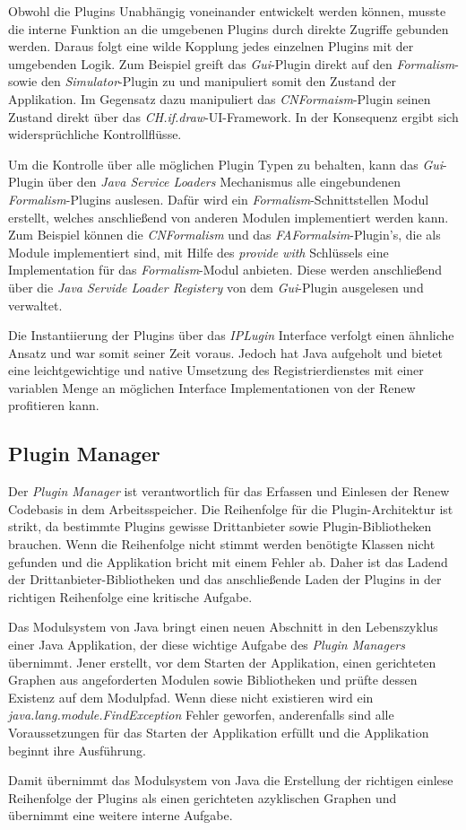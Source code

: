 Obwohl die Plugins Unabhängig voneinander entwickelt werden können, musste die interne Funktion an die umgebenen Plugins durch direkte Zugriffe gebunden werden. Daraus folgt eine wilde Kopplung jedes einzelnen Plugins mit der umgebenden Logik. Zum Beispiel greift das \textit{Gui}-Plugin direkt auf den \textit{Formalism}- sowie den \textit{Simulator}-Plugin zu und manipuliert somit den Zustand der Applikation. Im Gegensatz dazu manipuliert das \textit{CNFormaism}-Plugin seinen Zustand direkt über das \textit{CH.if.draw}-UI-Framework. In der Konsequenz ergibt sich widersprüchliche Kontrollflüsse.  


Um die Kontrolle über alle möglichen Plugin Typen zu behalten, kann das \textit{Gui}-Plugin über den \textit{Java Service Loaders} Mechanismus alle eingebundenen \textit{Formalism}-Plugins auslesen. Dafür wird ein \textit{Formalism}-Schnittstellen Modul erstellt, welches anschließend von anderen Modulen implementiert werden kann. Zum Beispiel können die \textit{CNFormalism} und das \textit{FAFormalsim}-Plugin's, die als Module implementiert sind, mit Hilfe des \textit{provide with} Schlüssels eine Implementation für das \textit{Formalism}-Modul anbieten. Diese werden anschließend über die \textit{Java Servide Loader Registery} von dem \textit{Gui}-Plugin ausgelesen und verwaltet. 

\bigbreak

Die Instantiierung der Plugins über das \textit{IPLugin} Interface verfolgt einen ähnliche Ansatz und war somit seiner Zeit voraus. Jedoch hat Java aufgeholt und bietet eine leichtgewichtige und native Umsetzung des Registrierdienstes mit einer variablen Menge an möglichen Interface Implementationen von der Renew profitieren kann.   


\subsection{Plugin Manager}
Der \textit{Plugin Manager} ist verantwortlich für das Erfassen und Einlesen der Renew Codebasis in dem Arbeitsspeicher. Die Reihenfolge für die Plugin-Architektur ist strikt, da bestimmte Plugins gewisse Drittanbieter sowie Plugin-Bibliotheken brauchen. Wenn die Reihenfolge nicht stimmt werden benötigte Klassen nicht gefunden und die Applikation bricht mit einem Fehler ab. Daher ist das Ladend der Drittanbieter-Bibliotheken und das anschließende Laden der Plugins in der richtigen Reihenfolge eine kritische Aufgabe. 
\bigbreak

Das Modulsystem von Java bringt einen neuen Abschnitt in den Lebenszyklus einer Java Applikation, der diese wichtige Aufgabe des \textit{Plugin Managers} übernimmt. Jener erstellt, vor dem Starten der Applikation, einen gerichteten Graphen aus angeforderten Modulen sowie Bibliotheken und prüfte dessen Existenz auf dem Modulpfad. Wenn diese nicht existieren wird ein \textit{java.lang.module.FindException} Fehler geworfen, anderenfalls sind alle Voraussetzungen für das Starten der Applikation erfüllt und die Applikation beginnt ihre Ausführung. 
\bigbreak

Damit übernimmt das Modulsystem von Java die Erstellung der richtigen einlese Reihenfolge der Plugins als einen gerichteten azyklischen Graphen und übernimmt eine weitere interne Aufgabe.
